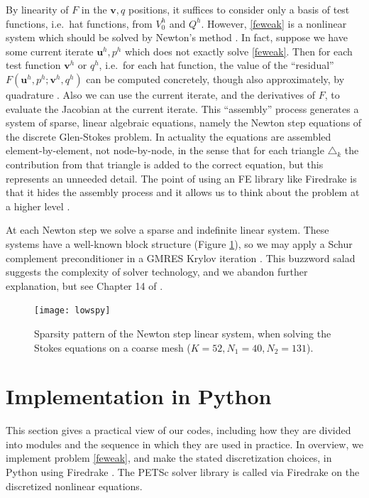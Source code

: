\documentclass[letterpaper,final,12pt,reqno]{amsart}
\newcommand{\bu}{\mathbf{u}}
\newcommand{\bv}{\mathbf{v}}
\begin{document}
By linearity of $F$ in the $\bv,q$ positions, it suffices to consider only a basis of test functions, i.e.~hat functions, from $V_0^h$ and $Q^h$.  However, \eqref{feweak} is a nonlinear system which should be solved by Newton's method \cite{Bueler2021,Kelley2003}.  In fact, suppose we have some current iterate $\bu^h,p^h$ which does not exactly solve \eqref{feweak}.  Then for each test function $\bv^h$ or $q^h$, i.e.~for each hat function, the value of the ``residual'' $F(\bu^h,p^h;\bv^h,q^h)$ can be computed concretely, though also approximately, by quadrature \cite{Bueler2021,Elmanetal2014}.  Also we can use the current iterate, and the derivatives of $F$, to evaluate the Jacobian at the current iterate.  This ``assembly'' process generates a system of sparse, linear algebraic equations, namely the Newton step equations of the discrete Glen-Stokes problem.  In actuality the equations are assembled element-by-element, not node-by-node, in the sense that for each triangle $\triangle_k$ the contribution from that triangle is added to the correct equation, but this represents an unneeded detail.  The point of using an FE library like Firedrake is that it hides the assembly process and it allows us to think about the problem at a higher level \cite{Rathgeberetal2016}.

At each Newton step we solve a sparse and indefinite linear system.  These systems have a well-known block structure (Figure \ref{fig:lowspy}), so we may apply a Schur complement preconditioner in a GMRES Krylov iteration \cite{Elmanetal2014,GolubVanLoan2013}.  This buzzword salad suggests the complexity of solver technology, and we abandon further explanation, but see Chapter 14 of \cite{Bueler2021}.

\begin{figure}[h]
\texttt{[image: lowspy]}
\caption{Sparsity pattern of the Newton step linear system, when solving the Stokes equations on a coarse mesh ($K=52,N_1=40,N_2=131$).}
\label{fig:lowspy}
\end{figure}


\section{Implementation in Python} \label{sec:implementation}

This section gives a practical view of our codes, including how they are divided into modules and the sequence in which they are used in practice.  In overview, we implement problem \eqref{feweak}, and make the stated discretization choices, in Python using Firedrake \cite{Rathgeberetal2016}.  The PETSc solver library \cite{Balayetal2018,Bueler2021} is called via Firedrake on the discretized nonlinear equations.
\end{document}
